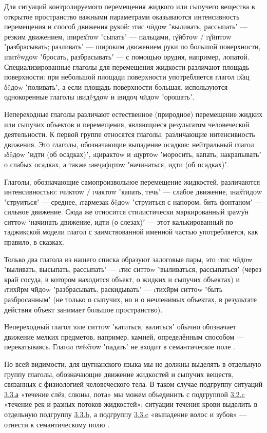 Для ситуаций контролируемого перемещения жидкого или сыпучего вещества в открытое пространство важными параметрами оказываются интенсивность перемещения и способ движения рукой: \i{тис чӣдоw} ʽвыливать, рассыпатьʼ — резким движением, \i{пирех̌тоw} ʽсыпатьʼ — пальцами, \i{ɣ̌ӣбтоw} / \i{ɣ̌ӣптоw} ʽразбрасывать; разливатьʼ — широким движением руки по большой поверхности, \i{питêwдоw} ʽбросать, разбрасыватьʼ — с помощью орудия, например, лопатой. Специализированные глаголы для перемещения жидкости различают площадь поверхности: при небольшой площади поверхности употребляется глагол \i{х̌ац δêдоw} ʽполиватьʼ, а если площадь поверхности большая, используются однокоренные глаголы \i{видêӡдоw} и \i{видоҷ чӣдоw} ʽорошатьʼ.

Непереходные глаголы различают естественное (природное) перемещение жидких или сыпучих объектов и перемещения, являющиеся результатом человеческой деятельности. К первой группе относятся глаголы, различающие интенсивность движения. Это глаголы, обозначающие выпадение осадков: нейтральный глагол \i{δêдоw} ʽидти (об осадках)ʼ, \i{цирактоw} и \i{цуртоw} ʽморосить, капать, накрапыватьʼ о слабых осадках, а также \i{анҷафцтоw} ʽначинаться, идти (об осадках)ʼ.

Глаголы, обозначающие самопроизвольное перемещение жидкостей, различаются интенсивностью: \i{чиктоw} / \i{чактоw} ʽкапать, течьʼ — слабое движение, \i{нах̌тӣдоw} ʽструитьсяʼ — среднее, \i{тармезак δêдоw} ʽструиться с напором, бить фонтаномʼ — сильное движение. Сюда же относится стилистически маркированный \i{раwу̊н ситтоw} ‘начинать движение, идти (о слезах)ʼ — этот калькированный по таджикской модели глагол с заимствованной именной частью употребляется, как правило, в сказках.

Только два глагола из нашего списка образуют залоговые пары, это \i{тис чӣдоw} ʽвыливать, высыпать, рассыпатьʼ — \i{тис ситтоw} ʽвыливаться, рассыпатьсяʼ (через край сосуда, в котором находится объект, о жидких и сыпучих объектах) и \i{тихӣрм чӣдоw} ʽразбрасывать, раскидыватьʼ — \i{тихӣрм ситтоw} ʽбыть разбросаннымʼ (не только о сыпучих, но и о нечленимых объектах, в результате действия объект занимает большое пространство).

Непереходный глагол \i{оле ситтоw} ʽкатиться, валитьсяʼ обычно обозначает движение мелких предметов, например, камней, определённым способом — перекатываясь. Глагол \i{wêх̌тоw} ʽпадатьʼ не входит в семантическое поле .

По всей видимости, для шугнанского языка мы не должны выделять в отдельную группу глаголы, обозначающие движение жидкостей и сыпучих веществ, связанных с физиологией человеческого тела. В таком случае подгруппу ситуаций \hyperref[pour-33a]{3.3.а} «течение слёз, слюны, пота» мы можем объединить с подгруппой \hyperref[pour-32c]{3.2.c} «течение рек и разных потоков жидкостей»; ситуации течения крови выделить в отдельную подгруппу \hyperref[pour-33b]{3.3.b}, а подгруппу \hyperref[pour-33c]{3.3.c} «выпадение волос и зубов» — отнести к семантическому полю .

